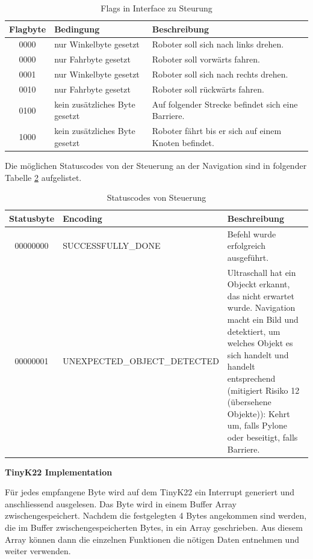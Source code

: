 \begin{table}[H]
\centering
\small
\begin{tabularx}{\textwidth}{|c|X|X|}
\hline
  \textbf{Flagbyte} & \textbf{Bedingung} & \textbf{Beschreibung}\\
  \hline
      0000&nur Winkelbyte gesetzt&Roboter soll sich nach links drehen.\\
  \hline
        0000&nur Fahrbyte gesetzt&Roboter soll vorwärts fahren.\\
  \hline
0001&nur Winkelbyte gesetzt&Roboter soll sich nach rechts drehen.\\
  \hline

0010&nur Fahrbyte gesetzt&Roboter soll rückwärts fahren.\\
  \hline

0100&kein zusätzliches Byte gesetzt&Auf folgender Strecke befindet sich eine Barriere.\\
  \hline
1000&kein zusätzliches Byte gesetzt&Roboter fährt bis er sich auf einem Knoten befindet.\\
  \hline
  \end{tabularx}
\caption{Flags in Interface zu Steurung}
\label{table:flag-to-tiny}
\end{table}



Die möglichen Statuscodes von der Steuerung an der Navigation sind in folgender Tabelle \ref{table:statuscodes} aufgelistet.

\begin{table}[H]
\centering
\small
\begin{tabularx}{\textwidth}{|c|l|X|}
\hline
  \textbf{Statusbyte} & \textbf{Encoding} & \textbf{Beschreibung} \\
  \hline
      00000000&SUCCESSFULLY\_DONE&Befehl wurde erfolgreich ausgeführt. \\
  \hline
00000001&UNEXPECTED\_OBJECT\_DETECTED &Ultraschall hat ein Objeckt erkannt, das nicht erwartet wurde. Navigation macht ein Bild und detektiert, um welches Objekt es sich handelt und handelt entsprechend (mitigiert Risiko 12 (übersehene Objekte)): Kehrt um, falls Pylone oder beseitigt, falls Barriere.\\
  \hline
\end{tabularx}
\caption{Statuscodes von Steuerung}
\label{table:statuscodes}
\end{table}

\textbf{TinyK22 Implementation}

Für jedes empfangene Byte wird auf dem TinyK22 ein Interrupt generiert und anschliessend ausgelesen. Das Byte wird in einem Buffer Array zwischengespeichert. Nachdem die festgelegten 4 Bytes angekommen sind werden, die im Buffer zwischengespeicherten Bytes, in ein Array geschrieben. Aus diesem Array können dann die einzelnen Funktionen die nötigen Daten entnehmen und weiter verwenden.


